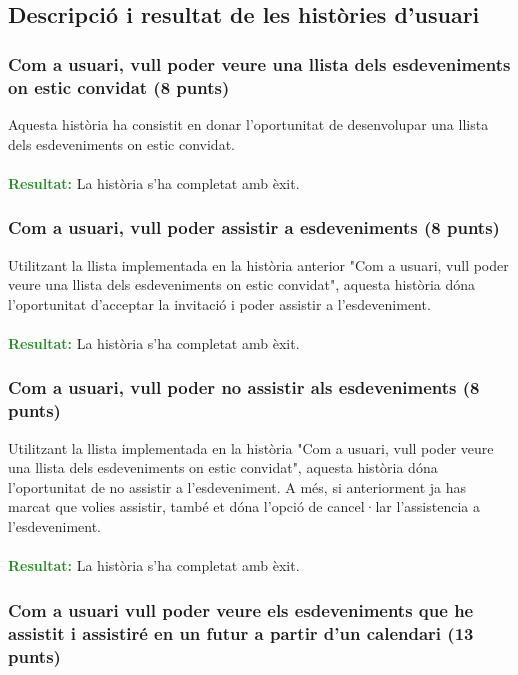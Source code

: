 \documentclass[11pt,catalan,listoffigures,listoftables]{tfgetsinf}
\begin{document}
\subsection{Descripció i resultat de les històries d'usuari}

\subsubsection{Com a usuari, vull poder veure una llista dels esdeveniments on estic convidat (8 punts)}

Aquesta història ha consistit en donar l'oportunitat de desenvolupar una llista dels esdeveniments on estic convidat.\\ \\
\textcolor{forestgreen}{\textbf{Resultat:}} La història s'ha completat amb èxit.

\subsubsection{Com a usuari, vull poder assistir a esdeveniments (8 punts)}

Utilitzant la llista implementada en la història anterior "Com a usuari, vull poder veure una llista dels esdeveniments on estic convidat", aquesta història dóna l'oportunitat d'acceptar la invitació i poder assistir a l'esdeveniment.\\ \\
\textcolor{forestgreen}{\textbf{Resultat:}} La història s'ha completat amb èxit.

\subsubsection{Com a usuari, vull poder no assistir als esdeveniments (8 punts)}

Utilitzant la llista implementada en la història "Com a usuari, vull poder veure una llista dels esdeveniments on estic convidat", aquesta història dóna l'oportunitat de no assistir a l'esdeveniment. A més, si anteriorment ja has marcat que volies assistir, també et dóna l'opció de cancel·lar l'assistencia a l'esdeveniment.\\ \\
\textcolor{forestgreen}{\textbf{Resultat:}} La història s'ha completat amb èxit.

\subsubsection{Com a usuari vull poder veure els esdeveniments que he assistit i assistiré en un futur a partir d'un calendari (13 punts)}
\end{document}
